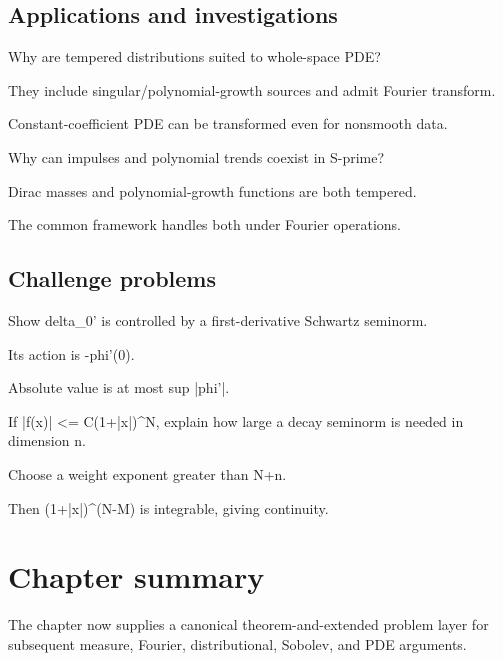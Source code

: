 \subsection*{Applications and investigations}

\begin{exercise}\label{exr:iii18-expand-13}
Why are tempered distributions suited to whole-space PDE?
\end{exercise}
\begin{hint}
They include singular/polynomial-growth sources and admit Fourier transform.
\end{hint}
\begin{solution}
Constant-coefficient PDE can be transformed even for nonsmooth data.
\end{solution}

\begin{exercise}\label{exr:iii18-expand-14}
Why can impulses and polynomial trends coexist in S-prime?
\end{exercise}
\begin{hint}
Dirac masses and polynomial-growth functions are both tempered.
\end{hint}
\begin{solution}
The common framework handles both under Fourier operations.
\end{solution}

\subsection*{Challenge problems}

\begin{exercise}\label{exr:iii18-expand-15}
Show delta\_0' is controlled by a first-derivative Schwartz seminorm.
\end{exercise}
\begin{hint}
Its action is -phi'(0).
\end{hint}
\begin{solution}
Absolute value is at most sup |phi'|.
\end{solution}

\begin{exercise}\label{exr:iii18-expand-16}
If |f(x)| <= C(1+|x|)\textasciicircum{}N, explain how large a decay seminorm is needed in dimension n.
\end{exercise}
\begin{hint}
Choose a weight exponent greater than N+n.
\end{hint}
\begin{solution}
Then (1+|x|)\textasciicircum{}(N-M) is integrable, giving continuity.
\end{solution}
\section*{Chapter summary}
The chapter now supplies a canonical theorem-and-extended problem layer for subsequent measure, Fourier, distributional, Sobolev, and PDE arguments.
